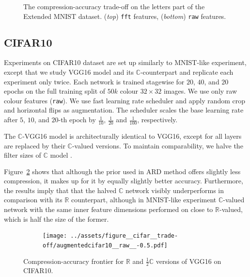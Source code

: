 \documentclass[a4paper,10pt]{article}
\newcommand{\real}{\mathbb{R}}
\newcommand{\cplx}{\mathbb{C}}
\begin{document}
\begin{figure}[!h]
\begin{subfigure}[b]{1.\textwidth}
  \end{subfigure}
  \caption{%
    The compression-accuracy trade-off on the letters part of the Extended MNIST dataset.
    (\textit{top}) \texttt{fft} features, (\textit{bottom}) \texttt{raw} features.
  }
  \label{fig:mnist-like__trade-off__emnist}
\end{figure}



\subsection{CIFAR10} %
\label{sub:cifar10}

Experiments on CIFAR10 dataset are set up similarly to MNIST-like experiment, except
that we study VGG16 model \citep{simonyan_very_2015} and its $\cplx$-counterpart and
replicate each experiment only twice. Each network is trained stagewise for $20$, $40$,
and $20$ epochs on the full training split of $50k$ colour $32\times32$ images. We use
only raw colour features (\texttt{raw}). We use fast learning rate scheduler and apply
random crop and horizontal flips as augmentation. The scheduler scales the base learning
rate after $5$, $10$, and $20$-th epoch by $\tfrac1{10}$, $\tfrac1{20}$ and $\tfrac1{100}$,
respectively.

The $\cplx$-VGG16 model is architecturally identical to VGG16, except for all layers are
replaced by their $\cplx$-valued versions. To maintain comparability, we halve the filter
sizes of $\cplx$ model \citep{monning_evaluation_2018}.

Figure~\ref{fig:figure__cifar10__trade-off} shows that although the prior used in ARD method
offers slightly less compression, it makes up for it by equally slightly better accuracy.
Furthermore, the results imply that that the halved $\cplx$ network visibly underperforms
in comparison with its $\real$ counterpart, although in MNIST-like experiment $\cplx$-valued
network with the same inner feature dimensions performed on close to $\real$-valued, which
is half the size of the former.

\begin{figure}[!h]
  \centering
  \begin{subfigure}[b]{0.9\textwidth}  %
    \centering
    \texttt{[image: ../assets/figure\_\_cifar\_\_trade-off/augmentedcifar10\_\_raw\_\_-0.5.pdf]}
  \end{subfigure}
  \caption{%
    Compression-accuracy frontier for $\real$ and $\tfrac12 \cplx$ versions of VGG16 on CIFAR10.
  }
  \label{fig:figure__cifar10__trade-off}
\end{figure}
\end{document}
